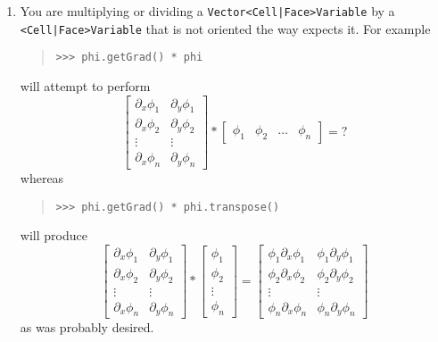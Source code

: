 \begin{description}
\begin{itemize}
\begin{enumerate}
                \item You are multiplying or dividing a 
                \verb+Vector<Cell|Face>Variable+ by a 
                \verb+<Cell|Face>Variable+ that is not oriented 
                the way \FiPy{} expects it. For example
                \begin{quote}
\begin{verbatim}
>>> phi.getGrad() * phi
\end{verbatim}
                \end{quote}
                will attempt to perform
                \[
                    \begin{bmatrix}
                        \partial_x\phi_1 & \partial_y\phi_1 \\
                        \partial_x\phi_2 & \partial_y\phi_2 \\
                        \vdots & \vdots \\
                        \partial_x\phi_n & \partial_y\phi_n
                    \end{bmatrix}
                    \ast
                    \begin{bmatrix}
                        \phi_1 & \phi_2 & \dots & \phi_n  
                    \end{bmatrix}
                    = \text{?}
                \]
                whereas
                \begin{quote}
\begin{verbatim}
>>> phi.getGrad() * phi.transpose()
\end{verbatim}
                \end{quote}
                will produce
                \[
                    \begin{bmatrix}
                        \partial_x\phi_1 & \partial_y\phi_1 \\
                        \partial_x\phi_2 & \partial_y\phi_2 \\
                        \vdots & \vdots \\
                        \partial_x\phi_n & \partial_y\phi_n
                    \end{bmatrix}
                    \ast
                    \begin{bmatrix}
                        \phi_1 \\ \phi_2 \\ \vdots \\ \phi_n  
                    \end{bmatrix}
                    =
                    \begin{bmatrix}
                        \phi_1\partial_x\phi_1 & \phi_1\partial_y\phi_1 \\
                        \phi_2\partial_x\phi_2 & \phi_2\partial_y\phi_2 \\
                        \vdots & \vdots \\
                        \phi_n\partial_x\phi_n & \phi_n\partial_y\phi_n
                    \end{bmatrix}
             \]
                as was probably desired.


\end{enumerate}
\end{itemize}
\end{description}
